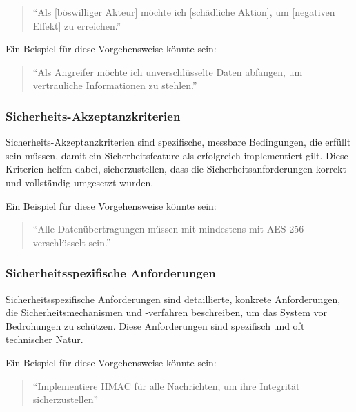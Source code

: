 \documentclass{article}
\begin{document}
\begin{quote}
``Als [böswilliger Akteur] möchte ich [schädliche Aktion], um [negativen Effekt] zu erreichen.''	
\end{quote}

\begin{flushleft}
Ein Beispiel für diese Vorgehensweise könnte sein:
\end{flushleft}

\begin{quote}
``Als Angreifer möchte ich unverschlüsselte Daten abfangen, um vertrauliche Informationen zu stehlen.''
\end{quote}

\subsubsection{Sicherheits-Akzeptanzkriterien}

Sicherheits-Akzeptanzkriterien sind spezifische, messbare Bedingungen, die erfüllt sein 
müssen, damit ein Sicherheitsfeature als erfolgreich implementiert gilt. Diese Kriterien 
helfen dabei, sicherzustellen, dass die Sicherheitsanforderungen korrekt und vollständig 
umgesetzt wurden.

\begin{flushleft}
Ein Beispiel für diese Vorgehensweise könnte sein:
\end{flushleft}

\begin{quote}
``Alle Datenübertragungen müssen mit mindestens mit AES-256 verschlüsselt sein.''
\end{quote}

\subsubsection{Sicherheitsspezifische Anforderungen}

Sicherheitsspezifische Anforderungen sind detaillierte, konkrete Anforderungen, die 
Sicherheitsmechanismen und -verfahren beschreiben, um das System vor Bedrohungen zu 
schützen. Diese Anforderungen sind spezifisch und oft technischer Natur.

\begin{flushleft}
Ein Beispiel für diese Vorgehensweise könnte sein:
\end{flushleft}

\begin{quote}
``Implementiere HMAC für alle Nachrichten, um ihre Integrität sicherzustellen''
\end{quote}
\end{document}
